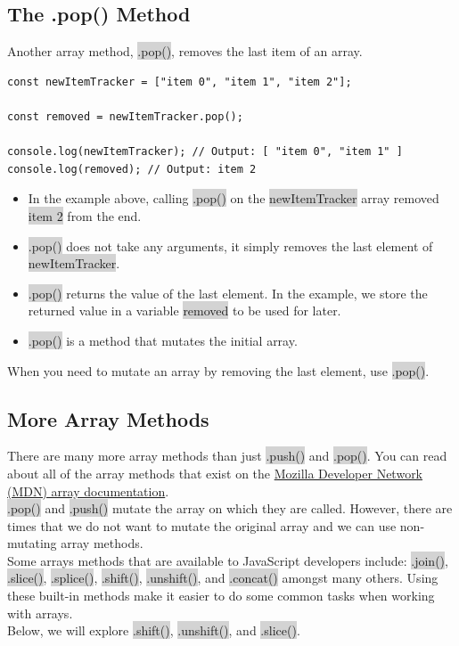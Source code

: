 \documentclass[11pt]{article}
\begin{document}
\subsection{The .pop() Method}
Another array method, \colorbox{lightgray}{.pop()}, removes the last item of an array.
\begin{lstlisting}
const newItemTracker = ["item 0", "item 1", "item 2"];

const removed = newItemTracker.pop();

console.log(newItemTracker); // Output: [ "item 0", "item 1" ]
console.log(removed); // Output: item 2
\end{lstlisting}
\begin{itemize}[leftmargin = *]
\item In the example above, calling \colorbox{lightgray}{.pop()} on the \colorbox{lightgray}{newItemTracker} array removed \colorbox{lightgray}{item 2} from the end.
\item \colorbox{lightgray}{.pop()} does not take any arguments, it simply removes the last element of \colorbox{lightgray}{newItemTracker}.
\item \colorbox{lightgray}{.pop()} returns the value of the last element. In the example, we store the returned value in a variable \colorbox{lightgray}{removed} to be used for later.
\item \colorbox{lightgray}{.pop()} is a method that mutates the initial array.

\end{itemize}
When you need to mutate an array by removing the last element, use \colorbox{lightgray}{.pop()}.

\subsection{More Array Methods}
There are many more array methods than just \colorbox{lightgray}{.push()} and \colorbox{lightgray}{.pop()}. You can read about all of the array methods that exist on the \href{https://developer.mozilla.org/en-US/docs/Web/JavaScript/Reference/Global_Objects/Array}{Mozilla Developer Network (MDN) array documentation}. \\
\newline
\colorbox{lightgray}{.pop()} and \colorbox{lightgray}{.push()} mutate the array on which they are called. However, there are times that we do not want to mutate the original array and we can use non-mutating array methods. \\
\newline
Some arrays methods that are available to JavaScript developers include: \colorbox{lightgray}{.join()}, \colorbox{lightgray}{.slice()}, \colorbox{lightgray}{.splice()}, \colorbox{lightgray}{.shift()}, \colorbox{lightgray}{.unshift()}, and \colorbox{lightgray}{.concat()} amongst many others. Using these built-in methods make it easier to do some common tasks when working with arrays. \\
\newline
Below, we will explore \colorbox{lightgray}{.shift()}, \colorbox{lightgray}{.unshift()}, and \colorbox{lightgray}{.slice()}. 
\end{document}
